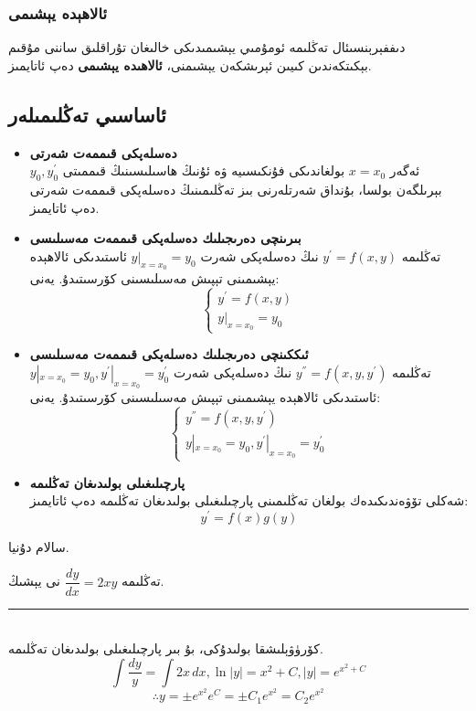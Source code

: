 \subsubsection{ئالاھېدە يېشىمى}
دىففېرېنسىئال تەڭلىمە ئومۇمىي يېشىمىدىكى خالىغان تۇراقلىق ساننى مۇقىم بېكىتكەندىن كىيىن ئېرىشكەن يېشىمنى، \textbf{ئالاھىدە يېشىمى} دەپ ئاتايمىز.

\subsection{ئاساسىي تەڭلىمىلەر}
\begin{itemize}
\item \textbf{دەسلەپكى قىممەت شەرتى}\\
ئەگەر $x=x_0$ بولغاندىكى فۇنكىسىيە ۋە ئۇنىڭ ھاسىلىسىنىڭ قىممىتى $y_0,y_{0}^{'}$ بېرىلگەن بولسا، بۇنداق شەرتلەرنى بىز تەڭلىمىنىڭ دەسلەپكى قىممەت شەرتى دەپ ئاتايمىز.
\item \textbf{بىرىنچى دەرىجىلىك دەسلەپكى قىممەت مەسىلىسى}\\
تەڭلىمە $y^{'}=f(x,y)$ نىڭ دەسلەپكى شەرت $y|_{x=x_0}=y_0$ ئاستىدىكى ئالاھېدە يېشىمىنى تېپىش مەسىلىسىنى كۆرسىتىدۇ. يەنى:
$$
\left\{\begin{array}{l}
y^{'} = f(x,y) \\
y|_{x=x_0}=y_0
\end{array}\right.
$$

\item \textbf{ئىككىنچى دەرىجىلىك دەسلەپكى قىممەت مەسىلىسى}\\
تەڭلىمە $y^{''}=f(x,y,y^{'})$ نىڭ دەسلەپكى شەرت $y|_{x=x_0}=y_0, y^{'}|_{x=x_0}=y_{0}^{'}$ ئاستىدىكى ئالاھېدە يېشىمىنى تېپىش مەسىلىسىنى كۆرسىتىدۇ. يەنى:
$$
\left\{\begin{array}{l}
y^{''}=f(x,y,y^{'}) \\
y|_{x=x_0}=y_0, y^{'}|_{x=x_0}=y_{0}^{'}
\end{array}\right.
$$
\item \textbf{پارچىلىغىلى بولىدىغان تەڭلىمە}\\
شەكلى تۆۋەندىكىدەك بولغان تەڭلىمىنى پارچىلىغىلى بولىدىغان تەڭلىمە دەپ ئاتايمىز:
$$
y^{'}=f(x)g(y)
$$
\end{itemize}

سالام دۇنيا.
\begin{myexample}
	تەڭلىمە
	$\dfrac{dy}{dx}=2xy$
	نى يېشىڭ.
	\\\rule{\linewidth}{0.05em}\\
	كۆرۈۋېلىشقا بولىدۇكى، بۇ بىر پارچىلىغىلى بولىدىغان تەڭلىمە.\\
$$\displaystyle{\int\dfrac{dy}{y}}=\int2x\,dx, \ln\vert y\vert=x^2+C, \vert y\vert=e^{x^2+C}$$
$$\therefore y=\pm e^{x^2}e^C=\pm C_1e^{x^2}=C_2e^{x^2}$$
\end{myexample}



